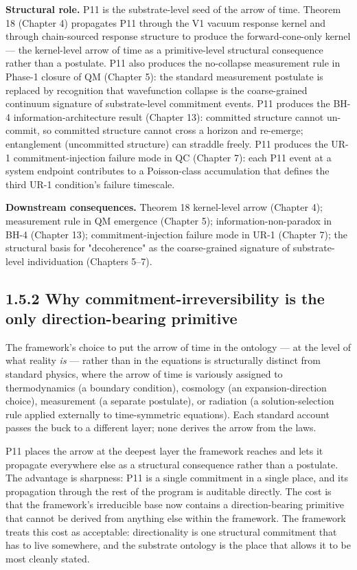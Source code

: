 \documentclass[11pt]{book}
\begin{document}
\textbf{Structural role.} P11 is the substrate-level seed of the arrow of time. Theorem 18 (Chapter 4) propagates P11 through the V1 vacuum response kernel and through chain-sourced response structure to produce the forward-cone-only kernel — the kernel-level arrow of time as a primitive-level structural consequence rather than a postulate. P11 also produces the no-collapse measurement rule in Phase-1 closure of QM (Chapter 5): the standard measurement postulate is replaced by recognition that wavefunction collapse is the coarse-grained continuum signature of substrate-level commitment events. P11 produces the BH-4 information-architecture result (Chapter 13): committed structure cannot un-commit, so committed structure cannot cross a horizon and re-emerge; entanglement (uncommitted structure) can straddle freely. P11 produces the UR-1 commitment-injection failure mode in QC (Chapter 7): each P11 event at a system endpoint contributes to a Poisson-class accumulation that defines the third UR-1 condition's failure timescale.

\textbf{Downstream consequences.} Theorem 18 kernel-level arrow (Chapter 4); measurement rule in QM emergence (Chapter 5); information-non-paradox in BH-4 (Chapter 13); commitment-injection failure mode in UR-1 (Chapter 7); the structural basis for "decoherence" as the coarse-grained signature of substrate-level individuation (Chapters 5–7).

\subsection{1.5.2 Why commitment-irreversibility is the only direction-bearing primitive}

The framework's choice to put the arrow of time in the ontology — at the level of what reality \textit{is} — rather than in the equations is structurally distinct from standard physics, where the arrow of time is variously assigned to thermodynamics (a boundary condition), cosmology (an expansion-direction choice), measurement (a separate postulate), or radiation (a solution-selection rule applied externally to time-symmetric equations). Each standard account passes the buck to a different layer; none derives the arrow from the laws.

P11 places the arrow at the deepest layer the framework reaches and lets it propagate everywhere else as a structural consequence rather than a postulate. The advantage is sharpness: P11 is a single commitment in a single place, and its propagation through the rest of the program is auditable directly. The cost is that the framework's irreducible base now contains a direction-bearing primitive that cannot be derived from anything else within the framework. The framework treats this cost as acceptable: directionality is one structural commitment that has to live somewhere, and the substrate ontology is the place that allows it to be most cleanly stated.
\end{document}
